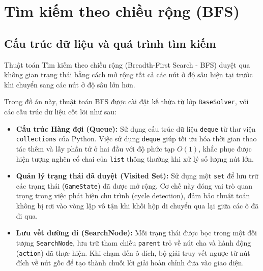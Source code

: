 \section{Tìm kiếm theo chiều rộng (BFS)}

\subsection{Cấu trúc dữ liệu và quá trình tìm kiếm}
Thuật toán Tìm kiếm theo chiều rộng (Breadth-First Search - BFS) duyệt qua không gian trạng thái bằng cách mở rộng tất cả các nút ở độ sâu hiện tại trước khi chuyển sang các nút ở độ sâu lớn hơn. 

Trong đồ án này, thuật toán BFS được cài đặt kế thừa từ lớp \texttt{BaseSolver}, với các cấu trúc dữ liệu cốt lõi như sau:
\begin{itemize}
    \item \textbf{Cấu trúc Hàng đợi (Queue):} Sử dụng cấu trúc dữ liệu \texttt{deque} từ thư viện \texttt{collections} của Python. Việc sử dụng \texttt{deque} giúp tối ưu hóa thời gian thao tác thêm và lấy phần tử ở hai đầu với độ phức tạp $O(1)$, khắc phục được hiện tượng nghẽn cổ chai của \texttt{list} thông thường khi xử lý số lượng nút lớn.
    \item \textbf{Quản lý trạng thái đã duyệt (Visited Set):} Sử dụng một \texttt{set} để lưu trữ các trạng thái (\texttt{GameState}) đã được mở rộng. Cơ chế này đóng vai trò quan trọng trong việc phát hiện chu trình (cycle detection), đảm bảo thuật toán không bị rơi vào vòng lặp vô tận khi khối hộp di chuyển qua lại giữa các ô đã đi qua.
    \item \textbf{Lưu vết đường đi (SearchNode):} Mỗi trạng thái được bọc trong một đối tượng \texttt{SearchNode}, lưu trữ tham chiếu \texttt{parent} trỏ về nút cha và hành động (\texttt{action}) đã thực hiện. Khi chạm đến ô đích, bộ giải truy vết ngược từ nút đích về nút gốc để tạo thành chuỗi lời giải hoàn chỉnh đưa vào giao diện.
\end{itemize}

